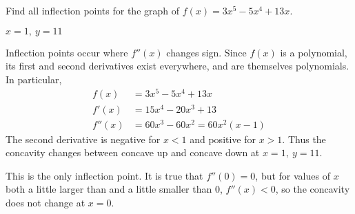 \begin{Mquestion}[1997D]
Find all inflection points for the graph of $f(x)=3x^5-5x^4+13x$.
\end{Mquestion}
\begin{answer}
$x=1,\ y=11$
\end{answer}
\begin{solution}
Inflection points occur where $f''(x)$ changes sign. Since $f(x)$ is a polynomial, its first and second derivatives exist everywhere, and are themselves polynomials. In particular,
\begin{align*}f(x)&=3x^5-5x^4+13x\\
f'(x)&=15x^4-20x^3+13\\
f''(x)&=60x^3-60x^2=60x^2(x-1)
\end{align*}
The second derivative is negative for $x<1$ and positive for $x>1$. Thus
the concavity changes between concave up and concave down at
{$x=1,\ y=11$}.

This is the only inflection point. It is true that $f''(0)=0$, but for values of $x$ both a little larger than and a little smaller than 0, $f''(x)<0$, so the concavity does not change at $x=0$.
\end{solution}


\subsection*{\Application}


